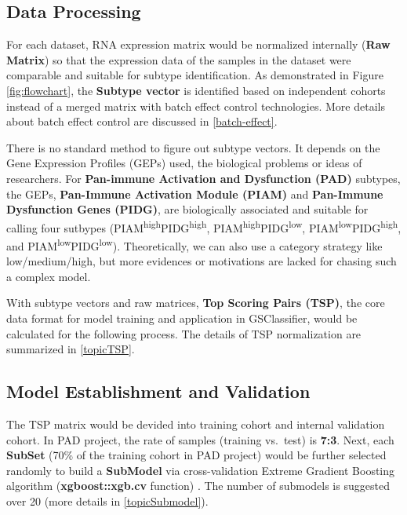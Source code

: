 \documentclass[
  12pt,
]{book}
\begin{document}
\hypertarget{data-processing}{%
\subsection{Data Processing}\label{data-processing}}

For each dataset, RNA expression matrix would be normalized internally (\textbf{Raw Matrix}) so that the expression data of the samples in the dataset were comparable and suitable for subtype identification. As demonstrated in Figure \ref{fig:flowchart}, the \textbf{Subtype vector} is identified based on independent cohorts instead of a merged matrix with batch effect control technologies. More details about batch effect control are discussed in \ref{batch-effect}.

There is no standard method to figure out subtype vectors. It depends on the Gene Expression Profiles (GEPs) used, the biological problems or ideas of researchers. For \textbf{Pan-immune Activation and Dysfunction (PAD)} subtypes, the GEPs, \textbf{Pan-Immune Activation Module (PIAM)} and \textbf{Pan-Immune Dysfunction Genes (PIDG)}, are biologically associated and suitable for calling four sutbypes (PIAM\textsuperscript{high}PIDG\textsuperscript{high}, PIAM\textsuperscript{high}PIDG\textsuperscript{low}, PIAM\textsuperscript{low}PIDG\textsuperscript{high}, and PIAM\textsuperscript{low}PIDG\textsuperscript{low}). Theoretically, we can also use a category strategy like low/medium/high, but more evidences or motivations are lacked for chasing such a complex model.

With subtype vectors and raw matrices, \textbf{Top Scoring Pairs (TSP)}, the core data format for model training and application in GSClassifier, would be calculated for the following process. The details of TSP normalization are summarized in \ref{topicTSP}.

\hypertarget{model-establishment-and-validation}{%
\subsection{Model Establishment and Validation}\label{model-establishment-and-validation}}

The TSP matrix would be devided into training cohort and internal validation cohort. In PAD project, the rate of samples (training vs.~test) is \textbf{7:3}. Next, each \textbf{SubSet} (70\% of the training cohort in PAD project) would be further selected randomly to build a \textbf{SubModel} via cross-validation Extreme Gradient Boosting algorithm (\textbf{xgboost::xgb.cv} function) \citep{RN345}. The number of submodels is suggested over 20 (more details in \ref{topicSubmodel}).
\end{document}
